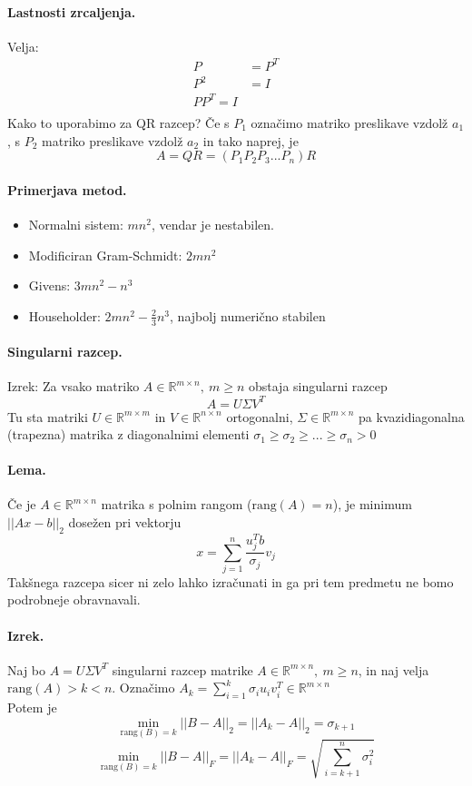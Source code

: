 \documentclass[a4paper]{article}
\newcommand{\R}{\mathbb{R}}
\newcommand{\norm}[1]{\left|\left|#1\right|\right|}
\begin{document}
\paragraph{Lastnosti zrcaljenja.} Velja:
\begin{align*}
    P & = P^T \\
    P^2 & = I \\
    PP^T = I \\
\end{align*}
Kako to uporabimo za QR razcep? Če s \(P_1\) označimo matriko preslikave vzdolž \(a_1\), s \(P_2\) matriko preslikave vzdolž \(a_2\) in tako naprej, je
\[A = QR = (P_1P_2P_3...P_n)R\]
\paragraph{Primerjava metod.}
\begin{itemize}
    \item Normalni sistem: \(mn^2\), vendar je nestabilen.
    \item Modificiran Gram-Schmidt: \(2mn^2\)
    \item Givens: \(3mn^2-n^3\)
    \item Householder: \(2mn^2-\frac{2}{3}n^3\), najbolj numerično stabilen
\end{itemize}
\paragraph{Singularni razcep.} Izrek: Za vsako matriko \(A \in \R^{m \times n},~m \geq n\) obstaja singularni razcep
\[A = U \Sigma V^T\]
Tu sta matriki \(U \in \R^{m \times m}\) in \(V \in \R^{n \times n}\) ortogonalni, \(\Sigma \in \R^{m \times n}\) pa kvazidiagonalna (trapezna) matrika
z diagonalnimi elementi \(\sigma_1 \geq \sigma_2 \geq ... \geq \sigma_n > 0\)
\paragraph{Lema.} Če je \(A \in \R^{m \times n}\) matrika s polnim rangom (\(\mathrm{rang}(A) = n\)), je minimum \(\norm{Ax-b}_2\) dosežen pri vektorju
\[x = \sum_{j=1}^n\frac{u_j^Tb}{\sigma_j}v_j\]
Takšnega razcepa sicer ni zelo lahko izračunati in ga pri tem predmetu ne bomo podrobneje obravnavali.
\paragraph{Izrek.} Naj bo \(A = U \Sigma V^T\) singularni razcep matrike \(A \in \R^{m \times n},~m \geq n\), in naj velja \(\mathrm{rang}(A) > k < n\).
Označimo \(\displaystyle{A_k = \sum_{i=1}^{k} \sigma_i u_i v_i^T \in \R^{m \times n}}\) \\[3mm]
Potem je \[\min_{\mathrm{rang}(B)=k} \norm{B-A}_2 = \norm{A_k - A}_2 = \sigma_{k+1}\]
\[\min_{\mathrm{rang}(B)=k} \norm{B-A}_F = \norm{A_k - A}_F = \sqrt{\sum_{i=k+1}^{n}\sigma_i^2}\]
\end{document}
